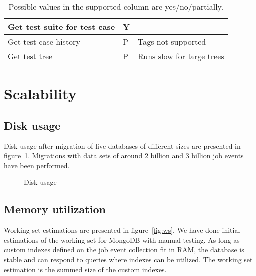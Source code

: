 \begin{table}[h]
\begin{tabular}{|l|l|l|}
Get test suite for test case                 & Y                                                                                        &                            \\ \hline
Get test case history                        & P                                                                                        & Tags not supported         \\ \hline
Get test tree                                & P                                                                                        & Runs slow for large trees  \\ \hline
\end{tabular}
\caption{Possible values in the supported column are yes/no/partially.}
\label{tab:archivequeries}
\end{table}


\section{Scalability}
\subsection{Disk usage}
Disk usage after migration of live databases of different sizes are presented in figure~\ref{fig:disc}. Migrations with data sets of around 2 billion and 3 billion job events have been performed.  
\begin{figure}[h!]
\centering
{}
\caption{Disk usage}
\label{fig:disc}
\end{figure}
\subsection{Memory utilization}
Working set estimations are presented in figure~\ref{fig:ws}. We have done initial estimations of the working set for MongoDB with manual testing. As long as custom indexes defined on the job event collection fit in RAM, the database is stable and can respond to queries where indexes can be utilized. The working set estimation is the summed size of the custom indexes.

